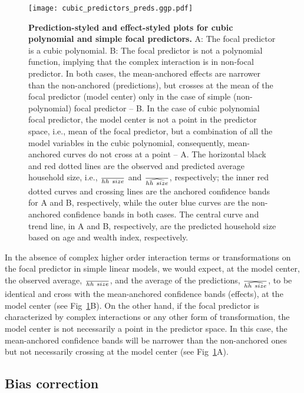 \begin{figure}[!h]
\begin{center}
\texttt{[image: cubic\_predictors\_preds.ggp.pdf]}
\end{center}
\caption{{\bf Prediction-styled and effect-styled plots for cubic polynomial and simple focal predictors.} A: The focal predictor is a cubic polynomial. B: The focal predictor is not a polynomial function, implying that the complex interaction is in non-focal predictor. In both cases, the mean-anchored effects are narrower than the non-anchored (predictions), but crosses at the mean of the focal predictor (model center) only in the case of simple (non-polynomial) focal predictor -- B. In the case of cubic polynomial focal predictor, the model center is not a point in the predictor space, i.e., mean of the focal predictor, but a combination of all the model variables in the cubic polynomial, consequently, mean-anchored curves do not cross at a point -- A. The horizontal black and red dotted lines are the observed and predicted average household size, i.e., $\over{hh~size}$ and $\over{\widehat{hh~size}}$, respectively; the inner red dotted curves and crossing lines are the anchored confidence bands for A and B, respectively, while the outer blue curves are the non-anchored confidence bands in both cases. The central curve and trend line, in A and B, respectively, are the predicted household size based on age and wealth index, respectively.}
\label{fig:pred_cubic_plots}
\end{figure}

In the absence of complex higher order interaction terms or transformations on the focal predictor in simple linear models, we would expect, at the model center, the observed average, $\over{hh~size}$, and the average of the predictions, $\over{\widehat{hh~size}}$, to be identical and cross with the mean-anchored confidence bands (effects), at the model center (see Fig~\ref{fig:pred_cubic_plots}B). On the other hand, if the focal predictor is characterized by complex interactions or any other form of transformation, the model center is not necessarily a point in the predictor space. In this case, the mean-anchored confidence bands will be narrower than the non-anchored ones but not necessarily crossing at the model center (see Fig~\ref{fig:pred_cubic_plots}A).

\subsection*{Bias correction}


